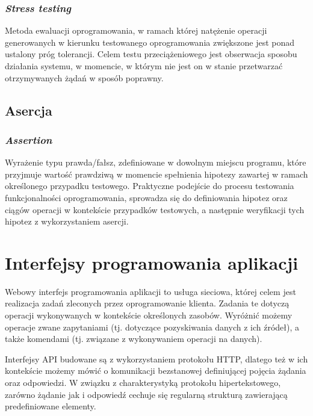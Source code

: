 \subsubsection{\textit{Stress testing}}
Metoda ewaluacji oprogramowania, w ramach której natężenie operacji generowanych w kierunku testowanego oprogramowania zwiększone jest ponad ustalony próg tolerancji. Celem testu przeciążeniowego jest obserwacja sposobu działania systemu, w momencie, w którym nie jest on w stanie przetwarzać otrzymywanych żądań w sposób poprawny.

\subsection*{Asercja}
\subsubsection{\textit{Assertion}}
Wyrażenie typu prawda/fałsz, zdefiniowane w dowolnym miejscu programu, które przyjmuje wartość prawdziwą w momencie spełnienia hipotezy zawartej w ramach określonego przypadku testowego. Praktyczne podejście do procesu testowania funkcjonalności oprogramowania, sprowadza się do definiowania hipotez oraz ciągów operacji w kontekście przypadków testowych, a następnie weryfikacji tych hipotez z wykorzystaniem asercji.

\section{Interfejsy programowania aplikacji}
\label{sec:api-teoria}
Webowy interfejs programowania aplikacji to usługa sieciowa, której celem jest realizacja zadań zleconych przez oprogramowanie klienta. Zadania te dotyczą operacji wykonywanych w kontekście określonych zasobów. Wyróżnić możemy operacje zwane zapytaniami (tj. dotyczące pozyskiwania danych z ich źródeł), a także komendami (tj. związane z wykonywaniem operacji na danych).

Interfejsy API budowane są z wykorzystaniem protokołu HTTP, dlatego też w ich kontekście możemy mówić o komunikacji bezstanowej definiującej pojęcia żądania oraz odpowiedzi. W związku z charakterystyką protokołu hipertekstowego, zarówno żądanie jak i odpowiedź cechuje się regularną strukturą zawierającą predefiniowane elementy.

